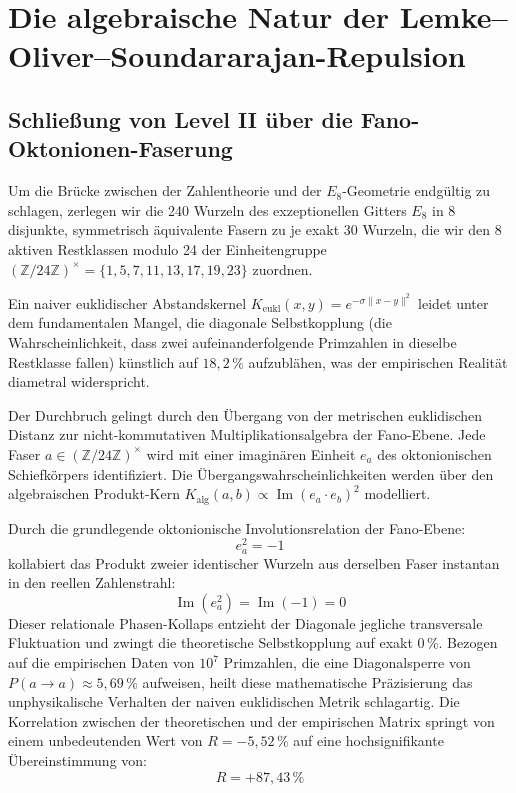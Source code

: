 \documentclass[11pt,a4paper]{article}
\numberwithin{equation}{section}
\begin{document}
	\section{Die algebraische Natur der Lemke--Oliver--Soundararajan-Repulsion}
	
	\subsection{Schließung von Level II über die Fano-Oktonionen-Faserung}
	
	Um die Brücke zwischen der Zahlentheorie und der $E_8$-Geometrie endgültig zu schlagen, zerlegen wir die 240 Wurzeln des exzeptionellen Gitters $E_8$ in 8 disjunkte, symmetrisch äquivalente Fasern zu je exakt 30 Wurzeln, die wir den 8 aktiven Restklassen modulo 24 der Einheitengruppe $(\mathbb{Z}/24\mathbb{Z})^\times = \{1, 5, 7, 11, 13, 17, 19, 23\}$ zuordnen.
	
	Ein naiver euklidischer Abstandskernel $K_{\text{eukl}}(x, y) = e^{-\sigma \|x-y\|^2}$ leidet unter dem fundamentalen Mangel, die diagonale Selbstkopplung (die Wahrscheinlichkeit, dass zwei aufeinanderfolgende Primzahlen in dieselbe Restklasse fallen) künstlich auf $18{,}2\,\%$ aufzublähen, was der empirischen Realität diametral widerspricht.
	
	Der Durchbruch gelingt durch den Übergang von der metrischen euklidischen Distanz zur nicht-kommutativen Multiplikationsalgebra der Fano-Ebene. Jede Faser $a \in (\mathbb{Z}/24\mathbb{Z})^\times$ wird mit einer imaginären Einheit $e_a$ des oktonionischen Schiefkörpers identifiziert. Die Übergangswahrscheinlichkeiten werden über den algebraischen Produkt-Kern $K_{\text{alg}}(a, b) \propto \operatorname{Im}(e_a \cdot e_b)^2$ modelliert.
	
	Durch die grundlegende oktonionische Involutionsrelation der Fano-Ebene:
	\begin{equation}
		e_a^2 = -1
	\end{equation}
	kollabiert das Produkt zweier identischer Wurzeln aus derselben Faser instantan in den reellen Zahlenstrahl:
	\begin{equation}
		\operatorname{Im}(e_a^2) = \operatorname{Im}(-1) = 0
	\end{equation}
	Dieser relationale Phasen-Kollaps entzieht der Diagonale jegliche transversale Fluktuation und zwingt die theoretische Selbstkopplung auf exakt $0\,\%$. Bezogen auf die empirischen Daten von $10^7$ Primzahlen, die eine Diagonalsperre von $P(a \to a) \approx 5{,}69\,\%$ aufweisen, heilt diese mathematische Präzisierung das unphysikalische Verhalten der naiven euklidischen Metrik schlagartig. Die Korrelation zwischen der theoretischen und der empirischen Matrix springt von einem unbedeutenden Wert von $R = -5{,}52\,\%$ auf eine hochsignifikante Übereinstimmung von:
	\begin{equation}
		R = +87{,}43\,\%
	\end{equation}
	
\end{document}
